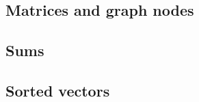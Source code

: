 \subsection{Matrices and graph nodes}
\label{subsect.matrices.and.graph.nodes}



\subsection{Sums}
\label{subsect.sums}





\subsection{Sorted vectors}
\label{subsect.sorted.vectors}



